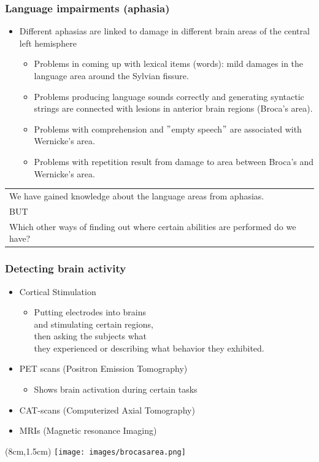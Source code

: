 \documentclass[12pt, table]{beamer}
\begin{document}
\begin{frame}
\frametitle{Language impairments (aphasia)}
\begin{itemize}
\item Different aphasias are linked to damage in different brain areas of the central left hemisphere 
\begin{itemize}
\item Problems in coming up with lexical items (words): mild damages in the language area around the Sylvian fissure.
\item Problems producing language sounds correctly and generating syntactic strings are connected with lesions in anterior brain regions (Broca's area).
\item Problems with comprehension and $"$empty speech$"$ are associated with Wernicke's area.
\item Problems with repetition result from damage to area between Broca's and Wernicke's area.
\end{itemize}
\end{itemize}
\end{frame}

\begin{frame}
\begin{tabularx}{\textwidth}{Y}
We have gained knowledge about the language areas from aphasias.\\[.5cm]
BUT\\[.5cm]
Which other ways of finding out where certain abilities are performed do we have?
\end{tabularx}
\end{frame}

\begin{frame}
\frametitle{Detecting brain activity}
\begin{itemize}
\item Cortical Stimulation
\begin{itemize}
\item Putting electrodes into brains \\ and stimulating certain regions, \\ then asking the subjects what \\ they experienced or describing what behavior they exhibited.
\end{itemize}
\item PET scans (Positron Emission Tomography)
\begin{itemize}
\item Shows brain activation during certain tasks
\end{itemize}
\item CAT-scans (Computerized Axial Tomography)
\item MRIs (Magnetic resonance Imaging)
\end{itemize}
\begin{textblock*}{8cm}(8cm,1.5cm)
\texttt{[image: images/brocasarea.png]}
\end{textblock*}
\end{frame}
\end{document}
